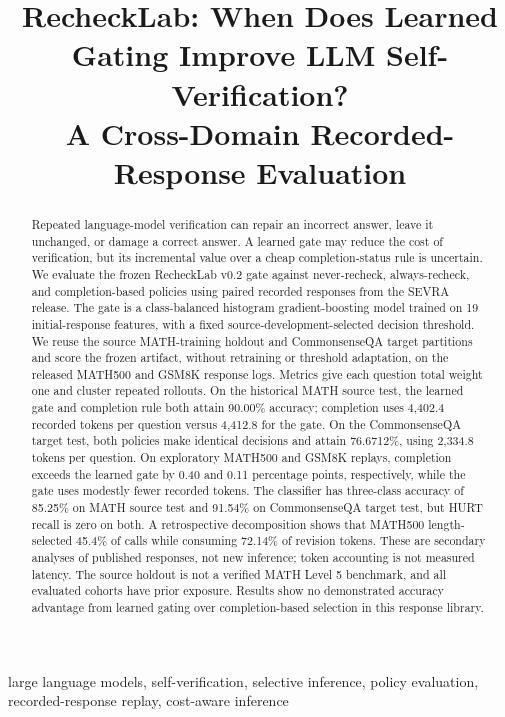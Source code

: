 \documentclass[conference]{IEEEtran}
\title{RecheckLab: When Does Learned Gating Improve LLM Self-Verification?\\
A Cross-Domain Recorded-Response Evaluation}
\author{\IEEEauthorblockN{Anonymous Authors}}
\begin{document}
\maketitle

\begin{abstract}
Repeated language-model verification can repair an incorrect answer, leave it unchanged, or damage a correct answer. A learned gate may reduce the cost of verification, but its incremental value over a cheap completion-status rule is uncertain. We evaluate the frozen RecheckLab v0.2 gate against never-recheck, always-recheck, and completion-based policies using paired recorded responses from the SEVRA release. The gate is a class-balanced histogram gradient-boosting model trained on 19 initial-response features, with a fixed source-development-selected decision threshold. We reuse the source MATH-training holdout and CommonsenseQA target partitions and score the frozen artifact, without retraining or threshold adaptation, on the released MATH500 and GSM8K response logs. Metrics give each question total weight one and cluster repeated rollouts. On the historical MATH source test, the learned gate and completion rule both attain 90.00\% accuracy; completion uses 4,402.4 recorded tokens per question versus 4,412.8 for the gate. On the CommonsenseQA target test, both policies make identical decisions and attain 76.6712\%, using 2,334.8 tokens per question. On exploratory MATH500 and GSM8K replays, completion exceeds the learned gate by 0.40 and 0.11 percentage points, respectively, while the gate uses modestly fewer recorded tokens. The classifier has three-class accuracy of 85.25\% on MATH source test and 91.54\% on CommonsenseQA target test, but HURT recall is zero on both. A retrospective decomposition shows that MATH500 length-selected 45.4\% of calls while consuming 72.14\% of revision tokens. These are secondary analyses of published responses, not new inference; token accounting is not measured latency. The source holdout is not a verified MATH Level 5 benchmark, and all evaluated cohorts have prior exposure. Results show no demonstrated accuracy advantage from learned gating over completion-based selection in this response library.
\end{abstract}

\begin{IEEEkeywords}
large language models, self-verification, selective inference, policy evaluation, recorded-response replay, cost-aware inference
\end{IEEEkeywords}
\end{document}

